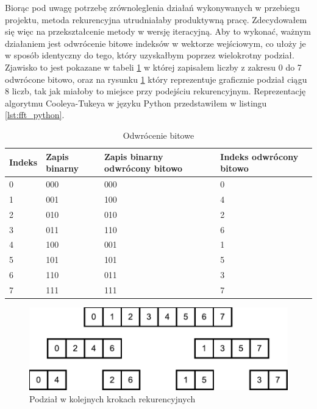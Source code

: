 \documentclass[a4paper,12pt]{book} %
\begin{document}
Biorąc pod uwagę potrzebę zrównoleglenia działań wykonywanych w przebiegu projektu, metoda rekurencyjna utrudniałaby produktywną pracę. Zdecydowałem się więc na przekształcenie metody w wersję iteracyjną. Aby to wykonać, ważnym działaniem jest odwrócenie bitowe indeksów w wektorze wejściowym, co ułoży je w sposób identyczny do tego, który uzyskałbym poprzez wielokrotny podział. Zjawisko to jest pokazane w tabeli \ref{tab:bit_reversal} w której zapisałem liczby z zakresu 0 do 7 odwrócone bitowo, oraz na rysunku \ref{fig:bit_reversal} który reprezentuje graficznie podział ciągu 8 liczb, tak jak miałoby to miejsce przy podejściu rekurencyjnym. Reprezentację algorytmu Cooleya-Tukeya w języku Python przedstawiłem w listingu \ref{lst:fft_python}.

\begin{table}[H]
\begin{adjustbox}{max width=\textwidth}
\begin{tabular}{|l|l|l|l|}
\hline
Indeks & Zapis binarny & Zapis binarny odwrócony bitowo & Indeks odwrócony bitowo \\
\hline
0 & 000 & 000 & 0 \\
1 & 001 & 100 & 4 \\
2 & 010 & 010 & 2 \\
3 & 011 & 110 & 6 \\
4 & 100 & 001 & 1 \\
5 & 101 & 101 & 5 \\
6 & 110 & 011 & 3 \\
7 & 111 & 111 & 7 \\
\hline
\end{tabular}
\end{adjustbox}
\caption{Odwrócenie bitowe}
\label{tab:bit_reversal}
\end{table}

\begin{figure}[h]
	\centering
	\includegraphics[scale=0.7]{assets/bit_reversal.pdf}
	\caption{Podział w kolejnych krokach rekurencyjnych}
	\label{fig:bit_reversal}
\end{figure}
\end{document}
